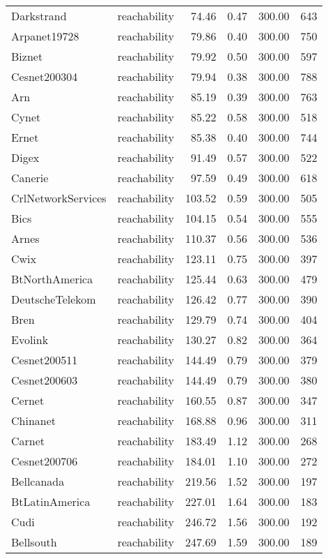\begin{tabular}{llrrrr}
Darkstrand & reachability & 74.46 & 0.47 & 300.00 & 643 \\
Arpanet19728 & reachability & 79.86 & 0.40 & 300.00 & 750 \\
Biznet & reachability & 79.92 & 0.50 & 300.00 & 597 \\
Cesnet200304 & reachability & 79.94 & 0.38 & 300.00 & 788 \\
Arn & reachability & 85.19 & 0.39 & 300.00 & 763 \\
Cynet & reachability & 85.22 & 0.58 & 300.00 & 518 \\
Ernet & reachability & 85.38 & 0.40 & 300.00 & 744 \\
Digex & reachability & 91.49 & 0.57 & 300.00 & 522 \\
Canerie & reachability & 97.59 & 0.49 & 300.00 & 618 \\
CrlNetworkServices & reachability & 103.52 & 0.59 & 300.00 & 505 \\
Bics & reachability & 104.15 & 0.54 & 300.00 & 555 \\
Arnes & reachability & 110.37 & 0.56 & 300.00 & 536 \\
Cwix & reachability & 123.11 & 0.75 & 300.00 & 397 \\
BtNorthAmerica & reachability & 125.44 & 0.63 & 300.00 & 479 \\
DeutscheTelekom & reachability & 126.42 & 0.77 & 300.00 & 390 \\
Bren & reachability & 129.79 & 0.74 & 300.00 & 404 \\
Evolink & reachability & 130.27 & 0.82 & 300.00 & 364 \\
Cesnet200511 & reachability & 144.49 & 0.79 & 300.00 & 379 \\
Cesnet200603 & reachability & 144.49 & 0.79 & 300.00 & 380 \\
Cernet & reachability & 160.55 & 0.87 & 300.00 & 347 \\
Chinanet & reachability & 168.88 & 0.96 & 300.00 & 311 \\
Carnet & reachability & 183.49 & 1.12 & 300.00 & 268 \\
Cesnet200706 & reachability & 184.01 & 1.10 & 300.00 & 272 \\
Bellcanada & reachability & 219.56 & 1.52 & 300.00 & 197 \\
BtLatinAmerica & reachability & 227.01 & 1.64 & 300.00 & 183 \\
Cudi & reachability & 246.72 & 1.56 & 300.00 & 192 \\
Bellsouth & reachability & 247.69 & 1.59 & 300.00 & 189 \\

\end{tabular}
